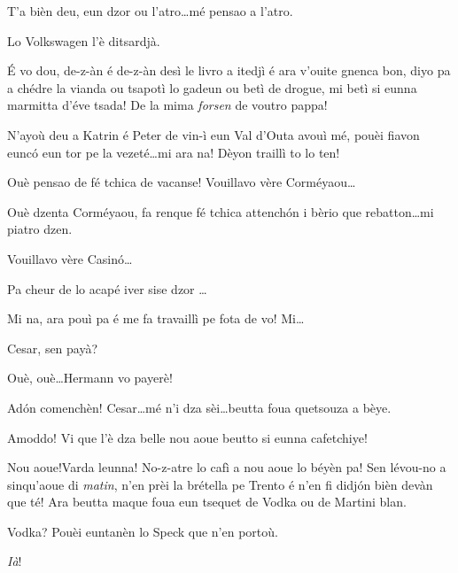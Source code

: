 \begin{drama}
\Cesarspeaks T'a bièn deu, eun dzor ou l'atro\ldots mé pensao a l'atro.


\Remyspeaks Lo Volkswagen l'è ditsardjà.

\Hermannspeaks{} \'E vo dou, de-z-àn é de-z-àn desì le livro a itedjì é ara v'ouite gnenca bon, diyo pa a chédre la vianda ou tsapotì lo gadeun ou betì de drogue, mi betì si eunna marmitta d’éve tsada! De la mima \textit{forsen} de voutro pappa!

\Hermannspeaks{} N'ayoù deu a Katrin é Peter de vin-ì eun Val d'Outa avouì mé, pouèi fiavon eunc\'o eun tor pe la vezeté\ldots mi ara na! Dèyon traillì to lo ten!

\Peterspeaks{}  Ouè pensao de fé tchica de vacanse! Vouillavo vère Corméyaou\ldots

\Cesarspeaks Ouè dzenta Corméyaou, fa renque fé tchica attench\'on i bèrio que rebatton\ldots mi piatro dzen.

\Peterspeaks Vouillavo vère Casin\'o\ldots

\Cesarspeaks Pa cheur de lo acapé iver sise dzor \ldots

\Peterspeaks Mi na, ara pouì pa é me fa travaillì pe fota de vo! Mi\ldots


\Katrinspeaks Cesar, sen payà?

\Cesarspeaks{} Ouè, ouè\ldots Hermann vo payerè!


\Hermannspeaks Ad\'on comenchèn! Cesar\ldots mé n'i dza sèi\ldots beutta foua quetsouza a bèye.

\Cesarspeaks Amoddo! Vi que l'è dza belle nou aoue beutto si eunna cafetchiye!

\Hermannspeaks{} Nou aoue!Varda leunna! No-z-atre lo cafì a nou aoue lo béyèn pa! Sen lévou-no a sinqu'aoue di \textit{matin}, n'en prèi la brétella pe Trento é n'en fi didj\'on bièn devàn que té! Ara beutta maque foua eun tsequet de Vodka ou de Martini blan.

\Peterspeaks {} Vodka? Pouèi euntanèn lo Speck que n'en portoù.

\Hermannspeaks \textit{Ià}!


\end{drama}
